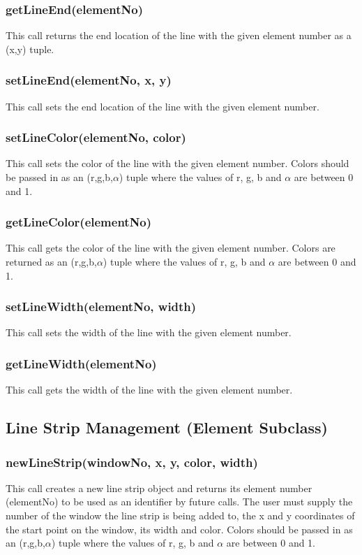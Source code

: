 \documentclass{acm_proc_article-sp}
\begin{document}
\subsubsection{getLineEnd(elementNo)}
This call returns the end location of the line with the given element number as a (x,y) tuple.
\subsubsection{setLineEnd(elementNo, x, y)}
This call sets the end location of the line with the given element number.
\subsubsection{setLineColor(elementNo, color)}
This call sets the color of the line with the given element number. Colors should be passed in as an (r,g,b,$\alpha$) tuple where the values of r, g, b and $\alpha$ are between 0 and 1.
\subsubsection{getLineColor(elementNo)}
This call gets the color of the line with the given element number. Colors are returned as an (r,g,b,$\alpha$) tuple where the values of r, g, b and $\alpha$ are between 0 and 1.
\subsubsection{setLineWidth(elementNo, width)}
This call sets the width of the line with the given element number.
\subsubsection{getLineWidth(elementNo)}
This call gets the width of the line with the given element number.
\subsection{Line Strip Management (Element Subclass)}
\subsubsection{newLineStrip(windowNo, x, y, color, width)}
This call creates a new line strip object and returns its element number (elementNo) to be used as an identifier by future calls. The user must supply the number of the window the line strip is being added to, the x and y coordinates of the start point on the window, its width and color. Colors should be passed in as an (r,g,b,$\alpha$) tuple where the values of r, g, b and $\alpha$ are between 0 and 1.
\end{document}
